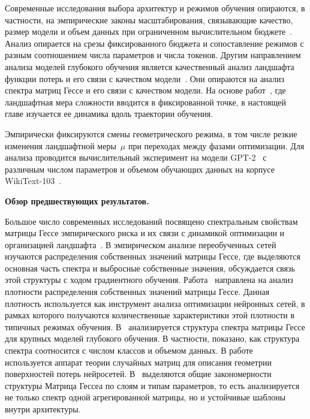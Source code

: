 Современные исследования выбора архитектур и режимов обучения опираются, в частности, на эмпирические законы масштабирования, связывающие качество, размер модели и объем данных при ограниченном вычислительном бюджете~\cite{kaplan2020ScalingLaws, hoffmann2022Chinchila}.
Анализ опирается на срезы фиксированного бюджета и сопоставление режимов с разным соотношением числа параметров и числа токенов.
Другим направлением анализа моделей глубокого обучения является качественный анализ ландшафта функции потерь и его связи с качеством модели~\cite{choromanska2015, li2018visualizing, fort2019emergent, fort2019large}.
Они опираются на анализ спектра матриц Гессе и его связи с качеством модели.
На основе работ~\cite{grabovoi2024unraveling748584228, grabovoi2024convnets743111032}, где ландшафтная мера сложности вводится в фиксированной точке, в настоящей главе изучается ее динамика вдоль траектории обучения.

Эмпирически фиксируются смены геометрического режима, в том числе резкие изменения ландшафтной меры~$\mu$ при переходах между фазами оптимизации.
Для анализа проводится вычислительный эксперимент на модели GPT-2~\cite{radford2019language} с различным числом параметров и объемом обучающих данных на корпусе WikiText-103~\cite{merity2016pointer}.

\label{ch1emp:sec:related}
\textbf{Обзор предшествующих результатов.}

Большое число современных исследований посвящено спектральным свойствам матрицы Гессе эмпирического риска и их связи с динамикой оптимизации и организацией ландшафта~\cite{sagun2018empiricalanalysishessianoverparametrized, pmlr-v97-ghorbani19b, papyan2019spectrumdeepnethessiansscale, pennington2017spectrum, wu2022dissecting}.
В эмпирическом анализе переобученных сетей~\cite{sagun2018empiricalanalysishessianoverparametrized} изучаются распределения собственных значений матрицы Гессе, где выделяются основная часть спектра и выбросные собственные значения, обсуждается связь этой структуры с ходом градиентного обучения.
Работа~\cite{pmlr-v97-ghorbani19b} направлена на анализ плотности распределения собственных значений матрицы Гессе.
Данная плотность используется как инструмент анализа оптимизации нейронных сетей, в рамках которого получаются количественные характеристики этой плотности в типичных режимах обучения.
В~\cite{papyan2019spectrumdeepnethessiansscale} анализируется структура спектра матрицы Гессе для крупных моделей глубокого обучения.
В частности, показано, как структура спектра соотносится с числом классов и объемом данных.
В работе~\cite{pennington2017spectrum} используется аппарат теории случайных матриц для описания геометрии поверхностей потерь нейросетей.
В~\cite{wu2022dissecting} выделяются общие закономерности структуры Матрица Гессеа по слоям и типам параметров, то есть анализируется не только спектр одной агрегированной матрицы, но и устойчивые шаблоны внутри архитектуры.

